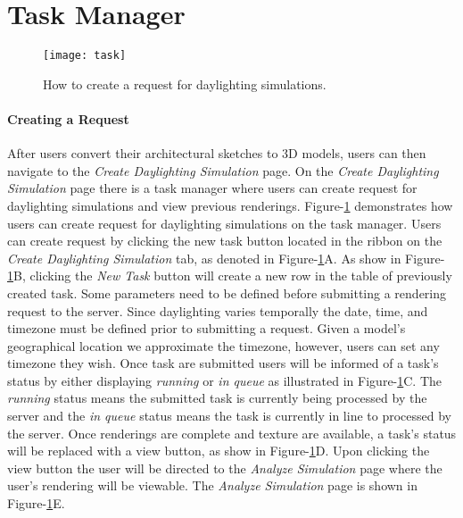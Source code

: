 \section{Task Manager}

	\begin{figure}[h]
	\centering
	\texttt{[image: task]}
	\caption{How to create a request for daylighting simulations. 
	}
	\label{fig:task}
	\end{figure}


	\paragraph{Creating a Request}
	After users convert their architectural sketches to 3D models, users can then navigate to the \textit{Create Daylighting Simulation} page.
	On the \textit{Create Daylighting Simulation} page there is a task manager where users can create request for daylighting simulations and view previous renderings.
	Figure-\ref{fig:task} demonstrates how users can create request for daylighting simulations on the task manager.
	Users can create request by clicking the new task button located in the ribbon on the \textit{Create Daylighting Simulation} tab, as denoted in Figure-\ref{fig:task}A.
	As show in Figure-\ref{fig:task}B, clicking the \textit{New Task} button will create a new row in the table of previously created task. 
	Some parameters need to be defined before submitting a rendering request to the server.
	Since daylighting varies temporally the date, time, and timezone must be defined prior to submitting a request.
	Given a model's geographical location we approximate the timezone, however, users can set any timezone they wish.
	Once task are submitted users will be informed of a task's status by either displaying \textit{running} or \textit{in queue} as illustrated in Figure-\ref{fig:task}C.
	The \textit{running} status means the submitted task is currently being processed by the server and the \textit{in queue} status means the task is currently in line to processed by the server.
	Once renderings are complete and texture are available, a task's status will be replaced with a view button, as show in Figure-\ref{fig:task}D.
	Upon clicking the view button the user will be directed to the \textit{Analyze Simulation} page where the user's rendering will be viewable.
	The \textit{Analyze Simulation} page is shown in Figure-\ref{fig:task}E.

